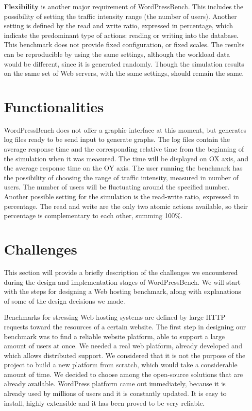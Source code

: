 \textbf{Flexibility} is another major requirement of WordPressBench. This includes the possibility of setting the traffic intensity range (the number of users). Another setting is defined by the read and write ratio, expressed in percentage, which indicate the predominant type of actions: reading or writing into the database. This benchmark does not provide fixed configuration, or fixed scales. The results can be reproducible by using the same settings, although the workload data would be different, since it is generated randomly. Though the simulation results on the same set of Web servers, with the same settings, should remain the same.

\section{Functionalities}
\label{sec:functionalities}

WordPressBench does not offer a graphic interface at this moment, but generates log files ready to be send input to generate graphs. The log files contain the average response time and the corresponding relative time from the beginning of the simulation when it was measured. The time will be displayed on OX axis, and the average response time on the OY axis.
The user running the benchmark has the possibility of choosing the range of  traffic intensity, measured in number of users. The number of users will be fluctuating around the specified number. Another possible setting for the simulation is the read-write ratio, expressed in percentage. The read and write are the only two atomic actions available, so their percentage is complementary to each other, summing 100\%.

\section{Challenges}
\label{sec:challenges}

This section will provide a briefly description of the challenges we encountered during the design and implementation stages of WordPressBench. We will start with the steps for designing a Web hosting benchmark, along with explanations of some of the design decisions we made.

Benchmarks for stressing Web hosting systems are defined by large HTTP requests toward the resources of a certain website. The first step in designing our benchmark was to find a reliable website platform, able to support a large amount of users at once. We needed a real web platform, already developed and which allows distributed support. We considered that it is not the purpose of the project to build a new platform from scratch, which would take a considerable amount of time. We decided to choose among the open-source solutions that are already available. WordPress platform came out immediately, because it is already used by millions of users and it is constantly updated. It is easy to install, highly extensible and it has been proved to be very reliable.

